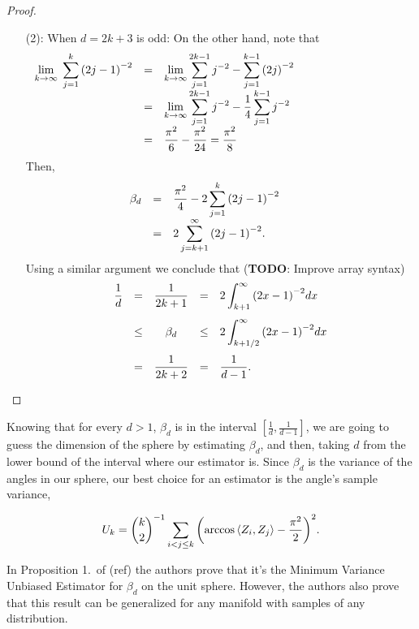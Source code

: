 \documentclass[12pt]{exam}
\theoremstyle{remark}
\newcommand{\angles}[1]{\ensuremath{\left\langle}#1\ensuremath{\right\rangle} }
\begin{document}
\begin{proof}
\begin{enumerate}
    \item[(2):] When $d = 2k+3$ is odd:
    On the other hand, note that
    \[\hspace{-35mm}\everymath{\displaystyle} 
      \begin{array}{rcl}
      \lim_{k\to\infty} \; \sum_{j = 1}^{k} {(2j-1)}^{-2} 
      & = & \lim_{k\to\infty} \sum_{j = 1}^{2k-1} j^{-2} - \sum_{j = 1}^{k-1} {(2j)}^{-2}\\
      & = & \lim_{k\to\infty} \sum_{j = 1}^{2k-1} j^{-2} - \frac{1}{4}\sum_{j = 1}^{k-1} j^{-2}\\
      & = & \frac{\pi^2}{6}-\frac{\pi^2}{24} = \frac{\pi^2}{8}
    \end{array}\]
    Then,
    \[\hspace{-10mm}\everymath{\displaystyle}
    \begin{array}{rll}
      \beta_d & = & \frac{\pi^2}{4} - 2 \sum_{j = 1}^{k} {\left(2j-1\right)}^{-2}\\
      & = & 2\sum_{j = k+1}^{\infty}{\left(2j-1\right)}^{-2}.\\
    \end{array}      
   \]
   Using a similar argument we conclude that (\textbf{TODO}: Improve array syntax)
   \[\everymath{\displaystyle} 
      \begin{array}{rrcrl}
        \frac{1}{d} & = & \frac{1}{2k+1}  & = & 2 \int_{k+1}^{\infty}{(2x-1)}^{-2} dx\\[5mm]
      & \leq & \beta_d    & \leq & 2 \int_{k+1/2}^{\infty}{(2x-1)}^{-2} dx\\[5mm]
      &  = & \frac{1}{2k+2} & = & \frac{1}{d-1}.
    \end{array}  \] 
  \end{enumerate}
\end{proof}

Knowing that for every $d > 1$, $\beta_d$ is in the interval $[\tfrac{1}{d}, \tfrac{1}{d-1}]$, we are going to guess the dimension of the sphere by estimating $\beta_d$, and then, taking $d$ from the lower bound of the interval where our estimator is. Since $\beta_d$ is the variance of the angles in our sphere, our best choice for an estimator is the angle's sample variance,


\begin{equation}\label{ade:2}
  U_{k} = \binom{k}{2}^{-1} \sum_{i<j\leq k}{\left(
    \arccos\angles{Z_i, Z_j} - \frac{\pi^2}{2} 
    \right)}^{2}.
\end{equation}

In Proposition 1.\ of (ref) the authors prove that it's the Minimum Variance Unbiased Estimator for $\beta_d$ on the unit sphere. However, the authors also prove that this result can be generalized for any manifold with samples of any distribution.\\[5mm]
\end{document}
